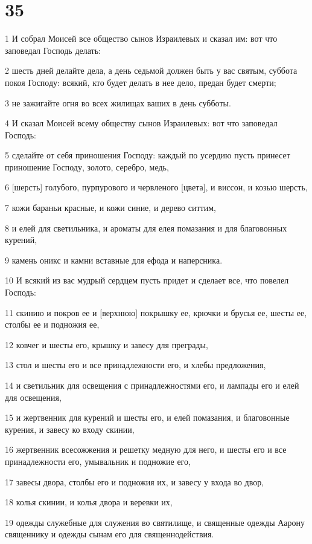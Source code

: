 \chapter{35}

\par 1 И собрал Моисей все общество сынов Израилевых и сказал им: вот что заповедал Господь делать:
\par 2 шесть дней делайте дела, а день седьмой должен быть у вас святым, суббота покоя Господу: всякий, кто будет делать в нее дело, предан будет смерти;
\par 3 не зажигайте огня во всех жилищах ваших в день субботы.
\par 4 И сказал Моисей всему обществу сынов Израилевых: вот что заповедал Господь:
\par 5 сделайте от себя приношения Господу: каждый по усердию пусть принесет приношение Господу, золото, серебро, медь,
\par 6 [шерсть] голубого, пурпурового и червленого [цвета], и виссон, и козью шерсть,
\par 7 кожи бараньи красные, и кожи синие, и дерево ситтим,
\par 8 и елей для светильника, и ароматы для елея помазания и для благовонных курений,
\par 9 камень оникс и камни вставные для ефода и наперсника.
\par 10 И всякий из вас мудрый сердцем пусть придет и сделает все, что повелел Господь:
\par 11 скинию и покров ее и [верхнюю] покрышку ее, крючки и брусья ее, шесты ее, столбы ее и подножия ее,
\par 12 ковчег и шесты его, крышку и завесу для преграды,
\par 13 стол и шесты его и все принадлежности его, и хлебы предложения,
\par 14 и светильник для освещения с принадлежностями его, и лампады его и елей для освещения,
\par 15 и жертвенник для курений и шесты его, и елей помазания, и благовонные курения, и завесу ко входу скинии,
\par 16 жертвенник всесожжения и решетку медную для него, и шесты его и все принадлежности его, умывальник и подножие его,
\par 17 завесы двора, столбы его и подножия их, и завесу у входа во двор,
\par 18 колья скинии, и колья двора и веревки их,
\par 19 одежды служебные для служения во святилище, и священные одежды Аарону священнику и одежды сынам его для священнодействия.
